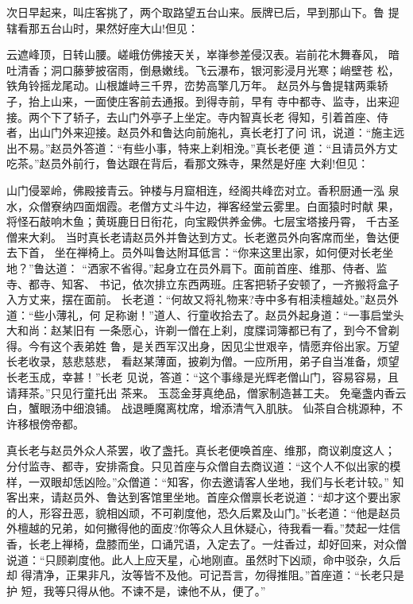 次日早起来，叫庄客挑了，两个取路望五台山来。辰牌已后，早到那山下。鲁
提辖看那五台山时，果然好座大山!但见：

云遮峰顶，日转山腰。嵯峨仿佛接天关，崒嵂参差侵汉表。岩前花木舞春风，
暗吐清香；洞口藤萝披宿雨，倒悬嫩线。飞云瀑布，银河影浸月光寒；峭壁苍
松，铁角铃摇龙尾动。山根雄峙三千界，峦势高擎几万年。
赵员外与鲁提辖两乘轿子，抬上山来，一面使庄客前去通报。到得寺前，早有
寺中都寺、监寺，出来迎接。两个下了轿子，去山门外亭子上坐定。寺内智真长老
得知，引着首座、侍者，出山门外来迎接。赵员外和鲁达向前施礼，真长老打了问
讯，说道：“施主远出不易。”赵员外答道：“有些小事，特来上刹相浼。”真长老便
道：“且请员外方丈吃茶。”赵员外前行，鲁达跟在背后，看那文殊寺，果然是好座
大刹!但见：

山门侵翠岭，佛殿接青云。钟楼与月窟相连，经阁共峰峦对立。香积厨通一泓
泉水，众僧寮纳四面烟霞。老僧方丈斗牛边，禅客经堂云雾里。白面猿时时献
果，将怪石敲响木鱼；黄斑鹿日日衔花，向宝殿供养金佛。七层宝塔接丹霄，
千古圣僧来大刹。
当时真长老请赵员外并鲁达到方丈。长老邀员外向客席而坐，鲁达便去下首，
坐在禅椅上。员外叫鲁达附耳低言：“你来这里出家，如何便对长老坐地？”鲁达道：
“洒家不省得。”起身立在员外肩下。面前首座、维那、侍者、监寺、都寺、知客、
书记，依次排立东西两班。庄客把轿子安顿了，一齐搬将盒子入方丈来，摆在面前。
长老道：“何故又将礼物来?寺中多有相渎檀越处。”赵员外道：“些小薄礼，何
足称谢！”道人、行童收拾去了。赵员外起身道：“一事启堂头大和尚：赵某旧有
一条愿心，许剃一僧在上刹，度牒词簿都已有了，到今不曾剃得。今有这个表弟姓
鲁，是关西军汉出身，因见尘世艰辛，情愿弃俗出家。万望长老收录，慈悲慈悲，
看赵某薄面，披剃为僧。一应所用，弟子自当准备，烦望长老玉成，幸甚！”长老
见说，答道：“这个事缘是光辉老僧山门，容易容易，且请拜茶。”只见行童托出
茶来。
玉蕊金芽真绝品，僧家制造甚工夫。
免毫盏内香云白，蟹眼汤中细浪铺。
战退睡魔离枕席，增添清气入肌肤。
仙茶自合桃源种，不许移根傍帝都。

真长老与赵员外众人茶罢，收了盏托。真长老便唤首座、维那，商议剃度这人；
分付监寺、都寺，安排斋食。只见首座与众僧自去商议道：“这个人不似出家的模
样，一双眼却恁凶险。”众僧道：“知客，你去邀请客人坐地，我们与长老计较。”
知客出来，请赵员外、鲁达到客馆里坐地。首座众僧禀长老说道：“却才这个要出家
的人，形容丑恶，貌相凶顽，不可剃度他，恐久后累及山门。”长老道：“他是赵员
外檀越的兄弟，如何撇得他的面皮?你等众人且休疑心，待我看一看。”焚起一炷信
香，长老上禅椅，盘膝而坐，口诵咒语，入定去了。一炷香过，却好回来，对众僧
说道：“只顾剃度他。此人上应天星，心地刚直。虽然时下凶顽，命中驳杂，久后却
得清净，正果非凡，汝等皆不及他。可记吾言，勿得推阻。”首座道：“长老只是护
短，我等只得从他。不谏不是，谏他不从，便了。”

